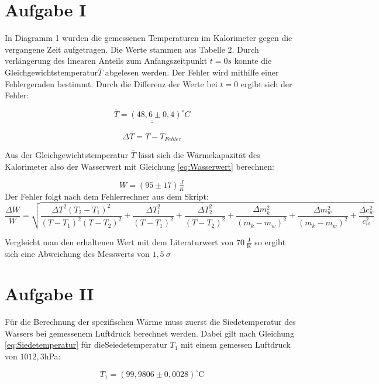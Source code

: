 \section{Aufgabe I}

In Diagramm 1 wurden die gemessenen Temperaturen im Kalorimeter gegen die vergangene Zeit aufgetragen. Die Werte
stammen aus Tabelle 2. Durch verlängerung des linearen Anteils zum Anfangszeitpunkt $t = 0s$ konnte die Gleichgewichtstemperatur$\overline{T}$ abgelesen werden.
Der Fehler wird mithilfe einer Fehlergeraden bestimmt. Durch die Differenz der Werte bei $t=0$ ergibt sich der Fehler:

\[ \underline{\underline{\overline{T} = (48,6 \pm 0,4)^\circ C}}\]

\begin{equation}
    \Delta \overline{T}= \overline{T}- \overline{T}_{Fehler}
\end{equation}

Aus der Gleichgewichtstemperatur $\overline{T}$ lässt sich die Wärmekapazität des Kalorimeter also der Wasserwert mit Gleichung \ref{eq:Wasserwert} berechnen:

\[W= ( 95 \pm  17) \tfrac{J}{K}\]
Der Fehler folgt nach dem Fehlerrechner aus dem Skript:
\begin{equation}
    \frac{\Delta W}{W}=\sqrt{\frac{\Delta T^{2} \left(T_{2} - T_{1} \right)^{2}}{\left(T - T_{1}\right)^{2} \left(T - T_{2}\right)^{2}} + \frac{\Delta T_{1}^{2}}{\left(T - T_{1}\right)^{2}} + \frac{\Delta T_{2}^{2}}{\left(T - T_{2}\right)^{2}} + \frac{\Delta m_{k}^{2}}{\left(m_{k} - m_{w}\right)^{2}} + \frac{\Delta m_{w}^{2}}{\left(m_{k} - m_{w}\right)^{2}} + \frac{\Delta c_{w}^{2}}{c_{w}^{2}}}
\end{equation}

Vergleicht man den erhaltenen Wert mit dem Literaturwert von $70 \ \tfrac{\text{J}}{\text{K}}$ so ergibt sich eine Abweichung des Messwerts von $1,5 \ \sigma$

\section{Aufgabe II}

Für die Berechnung der spezifischen Wärme muss zuerst die Siedetemperatur des Wassers bei gemessenem Luftdruck berechnet werden. Dabei gilt nach Gleichung \ref{eq:Siedetemperatur}
für dieSeiedetemperatur $T_1$ mit einem gemessen Luftdruck von $1012,3$hPa:

\[T_1 = (99,9806 \pm 0,0028) ^\circ \text{C}\]

